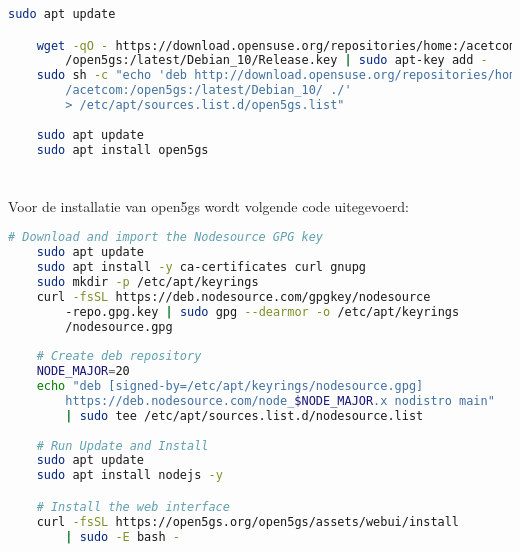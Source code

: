 
\begin{lstlisting}[language=Bash, caption=Installatie van Open5GS]
    sudo apt update

    wget -qO - https://download.opensuse.org/repositories/home:/acetcom:
        /open5gs:/latest/Debian_10/Release.key | sudo apt-key add -
    sudo sh -c "echo 'deb http://download.opensuse.org/repositories/home:
        /acetcom:/open5gs:/latest/Debian_10/ ./' 
        > /etc/apt/sources.list.d/open5gs.list"
    
    sudo apt update
    sudo apt install open5gs
\end{lstlisting}

\section{}

Voor de installatie van \gls{open5gs} wordt volgende code uitegevoerd:

\begin{lstlisting}[language=Bash, caption=Installatie van web-interface]
    # Download and import the Nodesource GPG key
    sudo apt update
    sudo apt install -y ca-certificates curl gnupg
    sudo mkdir -p /etc/apt/keyrings
    curl -fsSL https://deb.nodesource.com/gpgkey/nodesource
        -repo.gpg.key | sudo gpg --dearmor -o /etc/apt/keyrings
        /nodesource.gpg
    
    # Create deb repository
    NODE_MAJOR=20
    echo "deb [signed-by=/etc/apt/keyrings/nodesource.gpg] 
        https://deb.nodesource.com/node_$NODE_MAJOR.x nodistro main" 
        | sudo tee /etc/apt/sources.list.d/nodesource.list
    
    # Run Update and Install
    sudo apt update
    sudo apt install nodejs -y

    # Install the web interface
    curl -fsSL https://open5gs.org/open5gs/assets/webui/install 
        | sudo -E bash -
\end{lstlisting}

\section{}



\subsection{}



\subsection{}



\section{}

